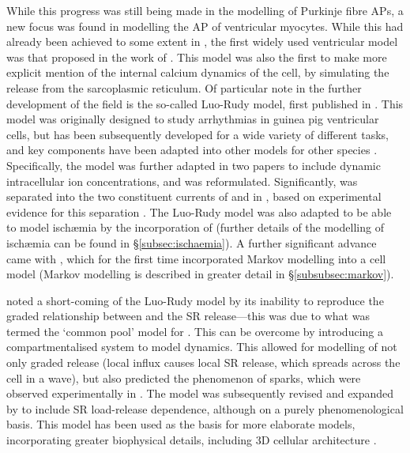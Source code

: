 \documentclass[../thesis-main.tex]{subfiles}
\begin{document}
 While this progress was still being made in the modelling of Purkinje fibre APs, a new focus was found in modelling the AP of ventricular myocytes. While this had already been achieved to some extent in \citet{Krause1966}, the first widely used ventricular model was that proposed in the work of \citet{Beeler1977}. This model was also the first to make more explicit mention of the internal calcium dynamics of the cell, by simulating the \ca{} release from the sarcoplasmic reticulum. Of particular note in the further development of the field is the so-called Luo-Rudy model, first published in \citet{Luo1991}. This model was originally designed to study arrhythmias in guinea pig ventricular cells, but has been subsequently developed for a wide variety of different tasks, and key components have been adapted into other models for other species \citep{Shaw1997a, Shaw1997b, Wagner1999, Viswanathan1999, Garfinkel2000, Shannon2004, Mahajan2008}. Specifically, the model was further adapted in two papers \citep{Luo1994, Luo1994a} to include dynamic intracellular ion concentrations, and \ica{} was reformulated. Significantly, \ik{} was separated into the two constituent currents of \ikr{} and \iks{} in \citet{Zeng1995}, based on experimental evidence for this separation \citep{Sanguinetti1990}. The Luo-Rudy model was also adapted to be able to model isch\ae{}mia by the incorporation of \ikatp{} \citep{Shaw1997} (further details of the modelling of isch\ae{}mia can be found in \S\ref{subsec:ischaemia}). A further significant advance came with \citet{Clancy1999}, which for the first time incorporated Markov modelling into a cell model (Markov modelling is described in greater detail in \S\ref{subsubsec:markov}).
 
 \citet{Stern1992} noted a short-coming of the Luo-Rudy model by its inability to reproduce the graded relationship between \ica{} and the SR \ca{} release---this was due to what was termed the `common pool' model for \ca{}. This can be overcome by introducing a compartmentalised system to model \ca{} dynamics. This allowed for modelling of not only graded \ca{} release (local \ica{} influx causes local SR \ca{} release, which spreads across the cell in a \ca{} wave), but also predicted the phenomenon of \ca{} sparks, which were observed experimentally in \citet{Cleemann1998}. The model was subsequently revised and expanded by \citet{Shiferaw2003} to include SR load-release dependence, although on a purely phenomenological basis. This model has been used as the basis for more elaborate models, incorporating greater biophysical details, including 3D cellular architecture \citep{Restrepo2008, Chen2009}.
 
\end{document}
